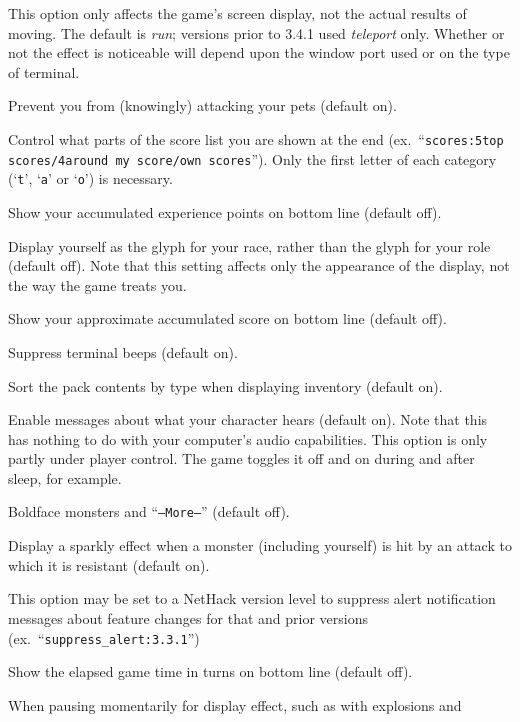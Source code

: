 This option only affects the game's screen display, not the actual
results of moving.  The default is {\it run\/}; versions prior to 3.4.1 
used {\it teleport\/} only.  Whether or not the effect is noticeable will
depend upon the window port used or on the type of terminal.
\item[\ib{safe\_pet}]
Prevent you from (knowingly) attacking your pets (default on).
\item[\ib{scores}]
Control what parts of the score list you are shown at the end (ex.\
``{\tt scores:5top scores/4around my score/own scores}'').  Only the first
letter of each category (`{\tt t}', `{\tt a}' or `{\tt o}') is necessary.
\item[\ib{showexp}]
Show your accumulated experience points on bottom line (default off).
\item[\ib{showrace}]
Display yourself as the glyph for your race, rather than the glyph
for your role (default off).  Note that this setting affects only
the appearance of the display, not the way the game treats you.
\item[\ib{showscore}]
Show your approximate accumulated score on bottom line (default off).
\item[\ib{silent}]
Suppress terminal beeps (default on).
\item[\ib{sortpack}]
Sort the pack contents by type when displaying inventory (default on).
\item[\ib{sound}]
Enable messages about what your character hears (default on).
Note that this has nothing to do with your computer's audio capabilities.
This option is only partly under player control.  The game toggles it
off and on during and after sleep, for example.
\item[\ib{standout}]
Boldface monsters and ``{\tt --More--}'' (default off).
\item[\ib{sparkle}]
Display a sparkly effect when a monster (including yourself) is hit by an
attack to which it is resistant (default on).
\item[\ib{suppress\_alert}]
This option may be set to a NetHack version level to suppress
alert notification messages about feature changes for that 
and prior versions (ex.\ ``{\tt suppress\_alert:3.3.1}'')
\item[\ib{time}]
Show the elapsed game time in turns on bottom line (default off).
\item[\ib{timed\_delay}]
When pausing momentarily for display effect, such as with explosions and
